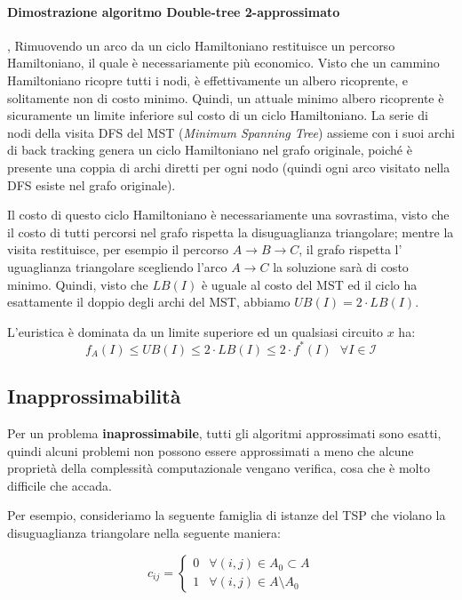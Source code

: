 \documentclass{article}
\begin{document}
\paragraph{Dimostrazione algoritmo Double-tree 2-approssimato},
Rimuovendo un arco da un ciclo Hamiltoniano restituisce un percorso Hamiltoniano,
il quale è necessariamente più economico. Visto che un cammino Hamiltoniano ricopre tutti
i nodi, è effettivamente un albero ricoprente, e solitamente non di costo minimo. Quindi,
un attuale minimo albero ricoprente è sicuramente un limite inferiore sul costo di un
ciclo Hamiltoniano. La serie di nodi della visita DFS del MST (\textit{Minimum Spanning Tree})
assieme con i suoi archi di back tracking genera un ciclo Hamiltoniano nel grafo originale,
poiché è presente una coppia di archi diretti per ogni nodo (quindi ogni arco visitato nella
DFS esiste nel grafo originale).

Il costo di questo ciclo Hamiltoniano è necessariamente una sovrastima, visto che il
costo di tutti percorsi nel grafo rispetta la disuguaglianza triangolare; mentre la visita
restituisce, per esempio il percorso $A\rightarrow B\rightarrow C$, il grafo rispetta l'
uguaglianza triangolare scegliendo l'arco $A\rightarrow C$ la soluzione sarà di costo minimo.
Quindi, visto che $LB(I)$ è uguale al costo del MST ed il ciclo ha esattamente il doppio
degli archi del MST, abbiamo $UB(I)=2\cdot LB(I)$.

L'euristica è dominata da un limite superiore ed un qualsiasi circuito $x$ ha:
$$f_A(I)\leq UB(I)\leq 2\cdot LB(I)\leq 2\cdot f^*(I) \text{   }\forall I\in \mathcal{I}$$

\subsection{Inapprossimabilità}
Per un problema \textbf{inaprossimabile}, tutti gli algoritmi approssimati sono esatti, quindi
alcuni problemi non possono essere approssimati a meno che alcune proprietà della
complessità computazionale vengano verifica, cosa che è molto difficile che accada.

Per esempio, consideriamo la seguente famiglia di istanze del TSP che violano la
disuguaglianza triangolare nella seguente maniera:

\[c_{ij}=\begin{cases}
        0 & \forall (i,j)\in A_0\subset A   \\
        1 & \forall (i,j)\in A\setminus A_0
    \end{cases}
\]
\end{document}
